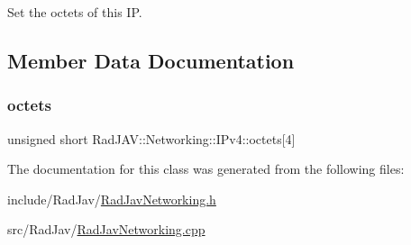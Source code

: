 Set the octets of this IP. 

\subsection{Member Data Documentation}
\mbox{\label{class_rad_j_a_v_1_1_networking_1_1_i_pv4_afe984ab9f910d7936b42fbb34c428610}} 
\subsubsection{\texorpdfstring{octets}{octets}}
{\footnotesize\ttfamily unsigned short Rad\+J\+A\+V\+::\+Networking\+::\+I\+Pv4\+::octets\mbox{[}4\mbox{]}\hspace{0.3cm}{\ttfamily [protected]}}



The documentation for this class was generated from the following files\+:\begin{DoxyCompactItemize}
\item 
include/\+Rad\+Jav/\mbox{\hyperlink{_rad_jav_networking_8h}{Rad\+Jav\+Networking.\+h}}\item 
src/\+Rad\+Jav/\mbox{\hyperlink{_rad_jav_networking_8cpp}{Rad\+Jav\+Networking.\+cpp}}\end{DoxyCompactItemize}
